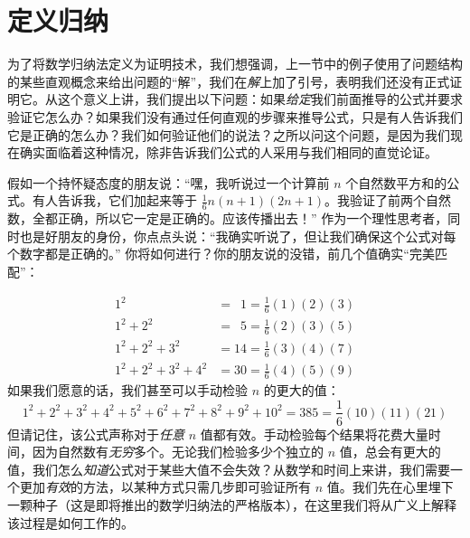 \section{定义归纳}

为了将数学归纳法定义为证明技术，我们想强调，上一节中的例子使用了问题结构的某些直观概念来给出问题的``解''，我们在\emph{解}上加了引号，表明我们还没有正式证明它。从这个意义上讲，我们提出以下问题：如果\emph{给定}我们前面推导的公式并要求验证它怎么办？如果我们没有通过任何直观的步骤来推导公式，只是有人告诉我们它是正确的怎么办？我们如何验证他们的说法？之所以问这个问题，是因为我们现在确实面临着这种情况，除非告诉我们公式的人采用与我们相同的直觉论证。

假如一个持怀疑态度的朋友说：``嘿，我听说过一个计算前 $n$ 个自然数平方和的公式。有人告诉我，它们加起来等于 $\frac{1}{6}n(n+1)(2n+1)$。我验证了前两个自然数，全都正确，所以它一定是正确的。应该传播出去！'' 作为一个理性思考者，同时也是好朋友的身份，你点点头说：``我确实听说了，但让我们确保这个公式对每个数字都是正确的。'' 你将如何进行？你的朋友说的没错，前几个值确实``完美匹配''：

\begin{align*}
    1^2 &= \enspace 1 = \frac{1}{6}(1)(2)(3) \\
    1^2 + 2^2 &= \enspace 5 = \frac{1}{6}(2)(3)(5) \\
    1^2 + 2^2 + 3^2 &= 14 = \frac{1}{6}(3)(4)(7) \\
    1^2 + 2^2 + 3^2 + 4^2 &= 30 = \frac{1}{6}(4)(5)(9)
\end{align*}
如果我们愿意的话，我们甚至可以手动检验 $n$ 的更大的值：
\[1^2 + 2^2 + 3^2 + 4^2 + 5^2 + 6^2 + 7^2 + 8^2 + 9^2 + 10^2 = 385 = \frac{1}{6}(10)(11)(21)\]
但请记住，该公式声称对于\emph{任意} $n$ 值都有效。手动检验每个结果将花费大量时间，因为自然数有\emph{无穷}多个。无论我们检验多少个独立的 $n$ 值，总会有更大的值，我们怎么\emph{知道}公式对于某些大值不会失效？从数学和时间上来讲，我们需要一个更加\emph{有效}的方法，以某种方式只需几步即可验证所有 $n$ 值。我们先在心里埋下一颗种子（这是即将推出的数学归纳法的严格版本），在这里我们将从广义上解释该过程是如何工作的。







